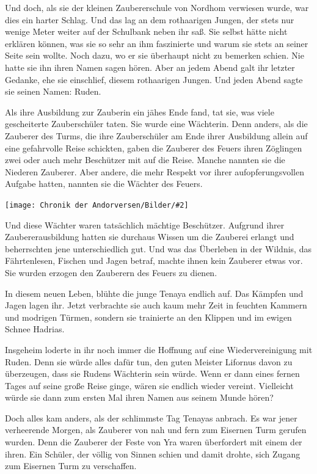 \documentclass[10pt, a4paper, oneside]{book}
\newcommand{\bildmitts}[2][height=0.32\textwidth,width=0.48\textwidth,keepaspectratio]{%
    \begin{center}
        \texttt{[image: Chronik der Andorversen/Bilder/\#2]}
    \end{center}
}
\begin{document}
\begin{multicols}{2}
Und doch, als sie der kleinen Zaubererschule von Nordhom verwiesen wurde, war dies ein harter Schlag. Und das lag an dem rothaarigen Jungen, der stets nur wenige Meter weiter auf der Schulbank neben ihr saß. Sie selbst hätte nicht erklären können, was sie so sehr an ihm faszinierte und warum sie stets an seiner Seite sein wollte. Noch dazu, wo er sie überhaupt nicht zu bemerken schien. Nie hatte sie ihn ihren Namen sagen hören. Aber an jedem Abend galt ihr letzter Gedanke, ehe sie einschlief, diesem rothaarigen Jungen. Und jeden Abend sagte sie seinen Namen: Ruden.

Als ihre Ausbildung zur Zauberin ein jähes Ende fand, tat sie, was viele gescheiterte Zauberschüler taten. Sie wurde eine Wächterin. Denn anders, als die Zauberer des Turms, die ihre Zauberschüler am Ende ihrer Ausbildung allein auf eine gefahrvolle Reise schickten, gaben die Zauberer des Feuers ihren Zöglingen zwei oder auch mehr Beschützer mit auf die Reise. Manche nannten sie die Niederen Zauberer. Aber andere, die mehr Respekt vor ihrer aufopferungsvollen Aufgabe hatten, nannten sie die Wächter des Feuers.

\bildmitts{Tenaya die Wächterin des Feuers Bild 1.jpg} 

Und diese Wächter waren tatsächlich mächtige Beschützer. Aufgrund ihrer Zaubererausbildung hatten sie durchaus Wissen um die Zauberei erlangt und beherrschten jene unterschiedlich gut. Und was das Überleben in der Wildnis, das Fährtenlesen, Fischen und Jagen betraf, machte ihnen kein Zauberer etwas vor. Sie wurden erzogen den Zauberern des Feuers zu dienen.

In diesem neuen Leben, blühte die junge Tenaya endlich auf. Das Kämpfen und Jagen lagen ihr. Jetzt verbrachte sie auch kaum mehr Zeit in feuchten Kammern und modrigen Türmen, sondern sie trainierte an den Klippen und im ewigen Schnee Hadrias.

Insgeheim loderte in ihr noch immer die Hoffnung auf eine Wiedervereinigung mit Ruden. Denn sie würde alles dafür tun, den guten Meister Lifornus davon zu überzeugen, dass sie Rudens Wächterin sein würde. Wenn er dann eines fernen Tages auf seine große Reise ginge, wären sie endlich wieder vereint. Vielleicht würde sie dann zum ersten Mal ihren Namen aus seinem Munde hören?

Doch alles kam anders, als der schlimmste Tag Tenayas anbrach. Es war jener verheerende Morgen, als Zauberer von nah und fern zum Eisernen Turm gerufen wurden. Denn die Zauberer der Feste von Yra waren überfordert mit einem der ihren. Ein Schüler, der völlig von Sinnen schien und damit drohte, sich Zugang zum Eisernen Turm zu verschaffen.


\end{multicols}
\end{document}
